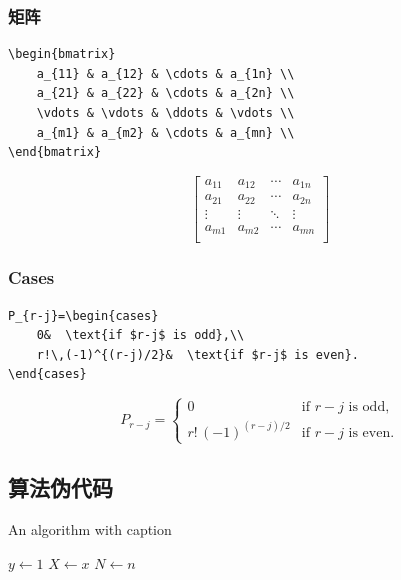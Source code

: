 \documentclass[11pt,a4paper,UTF8]{ctexart}
\begin{document}
\subsubsection*{矩阵}
\begin{lstlisting}[style=latex]
\begin{bmatrix}
    a_{11} & a_{12} & \cdots & a_{1n} \\
    a_{21} & a_{22} & \cdots & a_{2n} \\
    \vdots & \vdots & \ddots & \vdots \\
    a_{m1} & a_{m2} & \cdots & a_{mn} \\
\end{bmatrix}
\end{lstlisting}
\begin{equation}
    \begin{bmatrix}
    a_{11} & a_{12} & \cdots & a_{1n} \\
    a_{21} & a_{22} & \cdots & a_{2n} \\
    \vdots & \vdots & \ddots & \vdots \\
    a_{m1} & a_{m2} & \cdots & a_{mn} \\
    \end{bmatrix}
\end{equation}



\subsubsection*{Cases}
\begin{lstlisting}[style=latex]
P_{r-j}=\begin{cases}
    0&  \text{if $r-j$ is odd},\\
    r!\,(-1)^{(r-j)/2}&  \text{if $r-j$ is even}.
\end{cases}
\end{lstlisting}
\begin{equation}
    P_{r-j}=\begin{cases}
        0&  \text{if $r-j$ is odd},\\
        r!\,(-1)^{(r-j)/2}&  \text{if $r-j$ is even}.
    \end{cases}
\end{equation}

\newpage
\subsection{算法伪代码}

\begin{algorithm}[hbt!]
    \caption{An algorithm with caption}\label{alg:two}
    $y \gets 1$\;
    $X \gets x$\;
    $N \gets n$\;
\end{algorithm}
\end{document}
